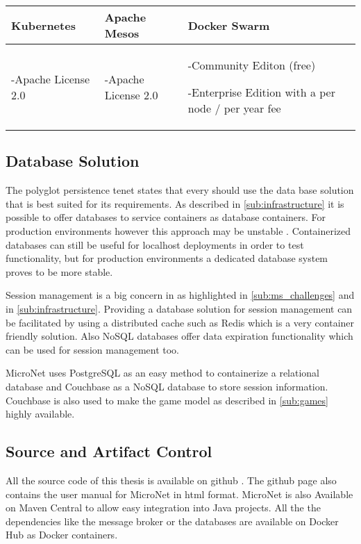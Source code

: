 \begin{center}
  \begin{tabular}{ | p{4.5cm} | p{4.5cm} | p{4.5cm} | }
    \hline
    \textbf{Kubernetes}&\textbf{Apache Mesos}&\textbf{Docker Swarm}\\\hline
    -Apache License 2.0 & 
    
    -Apache License 2.0 & 
    
    -Community Editon (free) 
    
    -Enterprise Edition with a per node / per year fee\\
    \hline
  \end{tabular}
\end{center}

\subsection{Database Solution}
\label{sub:database_solutions}

The polyglot persistence tenet states that every \ms{} should use the data base
solution that is best suited for its requirements. As described in
\autoref{sub:infrastructure} it is possible to offer databases to service
containers as database containers. For production environments however this
approach may be unstable \cite{cazorla2017db_containers}. Containerized
databases can still be useful for localhost deployments in order to test
functionality, but for production environments a dedicated database system
proves to be more stable.

Session management is a big concern in \ogs{} as highlighted in
\autoref{sub:ms_challenges} and in \autoref{sub:infrastructure}. Providing a
database solution for session management can be facilitated by using a
distributed cache such as Redis which is a very container friendly solution.
Also NoSQL databases offer data expiration functionality which can be used
for session management too.

MicroNet uses PostgreSQL as an easy method to containerize a relational database
and Couchbase as a NoSQL database to store session information. Couchbase is also
used to make the game model as described in \autoref{sub:games} highly
available.

\subsection{Source and Artifact Control}

All the source code of this thesis is available on github
\cite{micronet2017doku}. The github page also contains the user manual for
MicroNet in \gls{html} format. MicroNet is also Available on Maven Central to
allow easy integration into Java projects. All the the dependencies like the
message broker or the databases are available on Docker Hub as Docker
containers.

